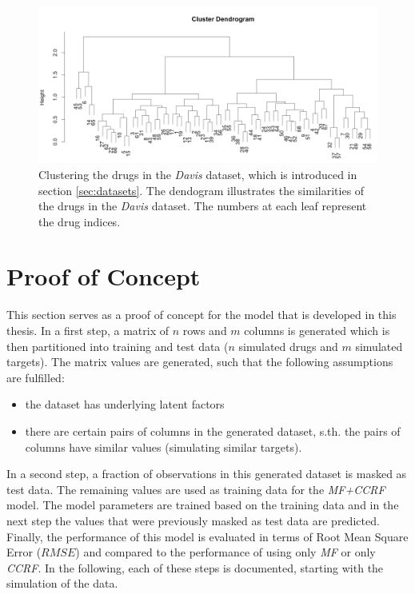 \begin{figure}[p]
\begin{center}
\includegraphics[scale=0.36]{davis_histogram.png}
\end{center}
\caption[Davis drugs clustering]{Clustering the drugs in the \textit{Davis} dataset, which is introduced in section \ref{sec:datasets}. The dendogram illustrates the similarities of the drugs in the \textit{Davis} dataset. The numbers at each leaf represent the drug indices. }
\label{davis_clustering}
\end{figure}


\section{Proof of Concept}

This section serves as a proof of concept for the model that is developed in this thesis. In a first step, a matrix of $n$ rows and $m$ columns is generated which is then partitioned into training and test data ($n$ simulated drugs and $m$ simulated targets). The matrix values are generated, such that the following assumptions are fulfilled:

\begin{itemize}
\item the dataset has underlying latent factors
\item there are certain pairs of columns in the generated dataset, s.th. the pairs of columns have similar values (simulating similar targets).
\end{itemize}

In a second step, a fraction of observations in this generated dataset is masked as test data. The remaining values are used as training data for the \textit{MF+CCRF} model. The model parameters are trained based on the training data and in the next step the values that were previously masked as test data are predicted. Finally, the performance of this model is evaluated in terms of Root Mean Square Error ($RMSE$) and compared to the performance of using only \textit{MF} or only \textit{CCRF}.
In the following, each of these steps is documented, starting with the simulation of the data.

